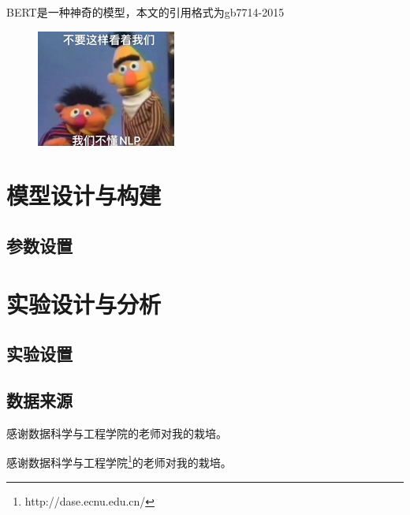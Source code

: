 \documentclass{ecnuthesis}
\begin{document}
BERT\cite{devlin-etal-2019-bert}是一种神奇的模型，本文的引用格式为gb7714-2015

\begin{figure}[H]
    \centering
    \includegraphics[scale=1.5]{source/bert_very_cute.png}
\end{figure}

\chapter{模型设计与构建}

\section{参数设置}

\chapter{实验设计与分析}

\section{实验设置}

\section{数据来源}

\backmatter
\printbibliography

\nocite{zhang2021dive}
\nocite{Goodfellow-et-al-2016}
\nocite{qiu2020nndl}

\begin{appendix}
 感谢数据科学与工程学院的老师对我的栽培。
\end{appendix}

\begin{acknowledgement}

感谢数据科学与工程学院\footnote{http://dase.ecnu.edu.cn/}的老师对我的栽培。
\end{acknowledgement}
\end{document}
